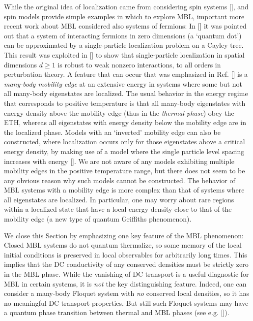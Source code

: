 \documentclass[amsmath,onecolumn, superscriptaddress,preprint,aps]{revtex4}
\renewcommand{\cite}[1]{[\onlinecite{#1}]}
\begin{document}
  While the original idea of localization came from considering spin systems \cite{Anderson}, and spin models provide simple examples in which to explore MBL,
  important more recent work about MBL considered also systems of fermions:  In \cite{agkl} it was pointed out that a system of interacting fermions in zero dimensions
  (a `quantum dot') can be approximated by a single-particle localization problem on a Cayley tree.  This result was exploited in \cite{BAA, Mirlin} to show that
  single-particle localization in spatial dimensions $d \ge 1$ is robust to weak nonzero interactions, to all orders in perturbation theory.
  A feature that can occur that was emphasized in Ref. \cite{BAA} is
  a {\it many-body mobility edge} at an extensive energy in systems where some but not all many-body eigenstates are localized.  The usual behavior in the energy regime that corresponds to positive temperature is that all many-body eigenstates with energy density above the mobility edge (thus in the {\it thermal phase}) obey the ETH, whereas all eigenstates with energy density below the mobility edge are in the localized phase.
  Models with an `inverted' mobility edge can also be constructed, where localization occurs only for those eigenstates above a critical energy density, by making use of a model where the single particle level spacing increases with energy \cite{MBLMore11}.  We are not aware of any models exhibiting multiple mobility edges in the positive temperature range, but there does not seem to be any obvious reason why such models cannot be constructed.  The behavior of MBL systems with a mobility edge is more complex than that of systems where all eigenstates are localized.  In particular, one may worry about rare regions within a localized state that have a local energy density close to that of the mobility edge (a new type of quantum Griffiths phenomenon).

We close this Section by emphasizing one key feature of the MBL phenomenon:  Closed MBL systems do not quantum thermalize, so some memory of the local initial conditions is preserved in local observables for arbitrarily long times.
This implies that the DC conductivity of any conserved densities must be strictly zero in the MBL phase.  While the vanishing of DC transport is
a useful diagnostic for MBL in certain systems, it is {\it not} the key distinguishing feature.
Indeed, one can consider a many-body Floquet system with {\it no} conserved
local densities, so it has no meaningful DC transport properties.  But still such Floquet systems may have a quantum phase transition between thermal and MBL phases  (see e.g. \cite{Floquet, Floquet2}).
\end{document}
